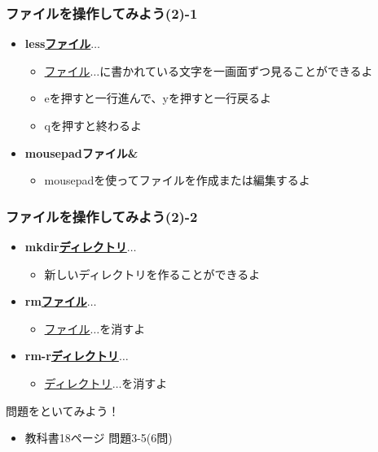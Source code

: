 \begin{frame}
    \frametitle{ファイルを操作してみよう(2)-1}
    \begin{itemize}
        \item {\bf less\textvisiblespace\underline{ファイル}$\ldots$}
        \begin{itemize}
            \small
            \item[] \underline{ファイル}$\ldots$に書かれている文字を一画面ずつ見ることができるよ
            \item[] eを押すと一行進んで、yを押すと一行戻るよ
            \item[] qを押すと終わるよ
        \end{itemize}
        \item {\bf mousepad\textvisiblespace ファイル\textvisiblespace\&}
        \begin{itemize}
            \small
            \item[] mousepadを使ってファイルを作成または編集するよ
        \end{itemize}
    \end{itemize}
\end{frame}

\begin{frame}
    \frametitle{ファイルを操作してみよう(2)-2}
    \begin{itemize}
        \item {\bf mkdir\textvisiblespace\underline{ディレクトリ}$\ldots$}
        \begin{itemize}
            \small
            \item[] 新しいディレクトリを作ることができるよ
        \end{itemize}
        \item {\bf rm\textvisiblespace\underline{ファイル}$\ldots$}
        \begin{itemize}
            \small
            \item[] \underline{ファイル}$\ldots$を消すよ
        \end{itemize}
        \item {\bf rm\textvisiblespace -r\textvisiblespace\underline{ディレクトリ}$\ldots$}
        \begin{itemize}
            \small
            \item[] \underline{ディレクトリ}$\ldots$を消すよ
        \end{itemize}
    \end{itemize}
    \begin{figure}[h]
        \centering
        
    \end{figure}
\end{frame}

\begin{frame}
    \begin{exampleblock}{問題をといてみよう！}
        \begin{itemize}
            \item 教科書18ページ 問題3-5(6問)
            \end{itemize}
    \end{exampleblock} 
\end{frame}
